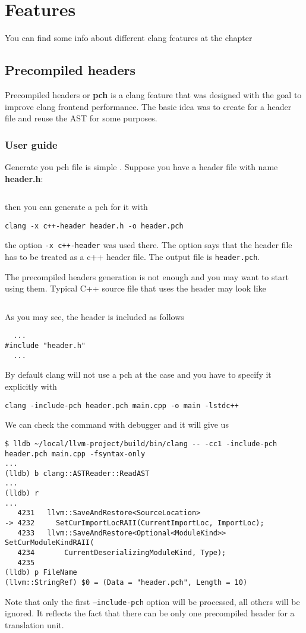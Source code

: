 \chapter{Features}

You can find some info about different clang features at the chapter

\section{Precompiled headers}
Precompiled headers or \textbf{pch} is a clang feature that was
designed with the goal to improve clang frontend performance. The
basic idea was to create  for a header file and reuse the AST for
some purposes.

\subsection{User guide}
Generate you pch file is simple \cite{clang:user_manual}. Suppose you have a header file with
name \textbf{header.h}:
\inputminted{c++}{./src/pch/simple/header.h} then you can generate a pch for it with
\begin{verbatim}
clang -x c++-header header.h -o header.pch
\end{verbatim}
the option \texttt{-x c++-header} was used there. The option says that
the header file has to be treated as a c++ header file. The output
file is \texttt{header.pch}.

The precompiled headers generation is not enough and you may want to
start using them. Typical C++ source file that uses the header may
look like
\inputminted{c++}{./src/pch/simple/main.cpp}
As you may see, the header is included as follows
\begin{verbatim}
  ...
#include "header.h"
  ...
\end{verbatim}
By default clang will not use a pch at the case and you have to
specify it explicitly with
\begin{verbatim}
clang -include-pch header.pch main.cpp -o main -lstdc++
\end{verbatim}
We can check the command with debugger and it will give us
\begin{verbatim}
$ lldb ~/local/llvm-project/build/bin/clang -- -cc1 -include-pch header.pch main.cpp -fsyntax-only
...
(lldb) b clang::ASTReader::ReadAST                                             
...
(lldb) r
...
   4231   llvm::SaveAndRestore<SourceLocation>
-> 4232     SetCurImportLocRAII(CurrentImportLoc, ImportLoc);
   4233   llvm::SaveAndRestore<Optional<ModuleKind>> SetCurModuleKindRAII(
   4234       CurrentDeserializingModuleKind, Type);
   4235 
(lldb) p FileName
(llvm::StringRef) $0 = (Data = "header.pch", Length = 10)
\end{verbatim}
Note that only the first \texttt{--include-pch} option will be
processed, all others will be ignored. It reflects the fact that there
can be only one precompiled header for a translation unit.

